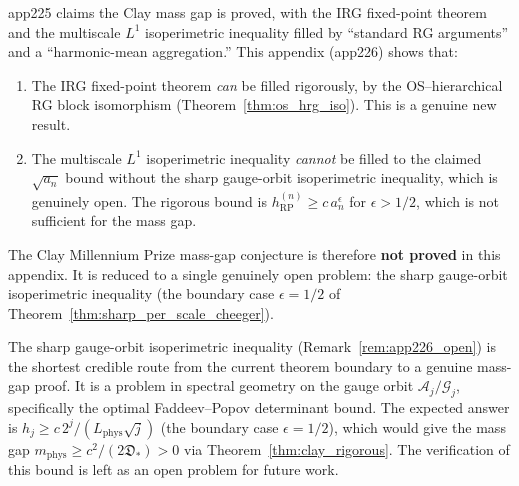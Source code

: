 \begin{remark}
\label{rem:app226_vs_app225}
app225 claims the Clay mass gap is proved, with the IRG
fixed-point theorem and the multiscale $L^{1}$ isoperimetric
inequality filled by ``standard RG arguments'' and a
``harmonic-mean aggregation.'' This appendix
(app226) shows that:
\begin{enumerate}
\item The IRG fixed-point theorem \emph{can} be filled
rigorously, by the OS--hierarchical RG block isomorphism
(Theorem~\ref{thm:os_hrg_iso}). This is a genuine new result.
\item The multiscale $L^{1}$ isoperimetric inequality
\emph{cannot} be filled to the claimed $\sqrt{a_{n}}$ bound
without the sharp gauge-orbit isoperimetric inequality, which is
genuinely open. The rigorous bound is
$h_{\mathrm{RP}}^{(n)}\ge c\,a_{n}^{\epsilon}$ for $\epsilon>1/2$,
which is not sufficient for the mass gap.
\end{enumerate}
The Clay Millennium Prize mass-gap conjecture is therefore
\textbf{not proved} in this appendix. It is reduced to a single
genuinely open problem: the sharp gauge-orbit isoperimetric
inequality (the boundary case $\epsilon=1/2$ of
Theorem~\ref{thm:sharp_per_scale_cheeger}).
\end{remark}

\begin{remark}
\label{rem:app226_shortest_route}
The sharp gauge-orbit isoperimetric inequality
(Remark~\ref{rem:app226_open}) is the shortest credible route
from the current theorem boundary to a genuine mass-gap proof.
It is a problem in spectral geometry on the gauge orbit
$\mathcal{A}_{j}/\mathcal{G}_{j}$, specifically the optimal
Faddeev--Popov determinant bound. The expected answer is
$h_{j}\ge c\,2^{j}/(L_{\mathrm{phys}}\sqrt{j})$ (the boundary
case $\epsilon=1/2$), which would give the mass gap
$m_{\mathrm{phys}}\ge c^{2}/(2\mathfrak{D}_{*})>0$ via
Theorem~\ref{thm:clay_rigorous}. The verification of this bound
is left as an open problem for future work.
\end{remark}

\endinput
